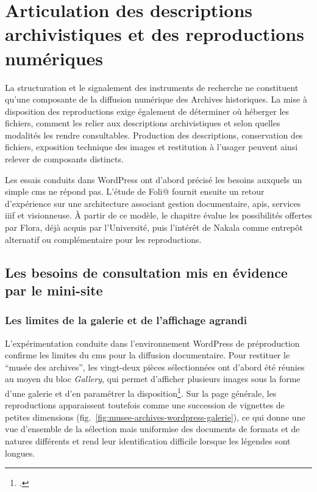 \chapter{Articulation des descriptions archivistiques et des reproductions numériques}
\label{chap:articulation-descriptions-reproductions}

La structuration et le \gls{signalement} des instruments de recherche ne constituent qu'une composante de la diffusion numérique des Archives historiques. La mise à disposition des reproductions exige également de déterminer où héberger les fichiers, comment les relier aux descriptions archivistiques et selon quelles modalités les rendre consultables. Production des descriptions, conservation des fichiers, exposition technique des images et restitution à l'usager peuvent ainsi relever de composants distincts.

Les essais conduits dans WordPress ont d'abord précisé les besoins auxquels un simple \gls{cms} ne répond pas. L'étude de Foli@ fournit ensuite un retour d'expérience sur une architecture associant gestion documentaire, \glspl{api}, services \gls{iiif} et visionneuse. À partir de ce modèle, le chapitre évalue les possibilités offertes par Flora, déjà acquis par l'Université, puis l'intérêt de Nakala comme entrepôt alternatif ou complémentaire pour les reproductions.


\section{Les besoins de consultation mis en évidence par le mini-site}
\label{sec:limites-cms-diffusion-documentaire}

\subsection{Les limites de la galerie et de l'affichage agrandi}

L'expérimentation conduite dans l'environnement WordPress de préproduction confirme les limites du \gls{cms} pour la diffusion documentaire. Pour restituer le \enquote{musée des archives}, les vingt-deux pièces sélectionnées ont d'abord été réunies au moyen du bloc \emph{Gallery}, qui permet d'afficher plusieurs images sous la forme d'une galerie et d'en paramétrer la disposition\footcite{WordPressGalleryBlock}. Sur la page générale, les reproductions apparaissent toutefois comme une succession de vignettes de petites dimensions (fig.~\ref{fig:musee-archives-wordpress-galerie}), ce qui donne une vue d'ensemble de la sélection mais uniformise des documents de formats et de natures différents et rend leur identification difficile lorsque les légendes sont longues.

